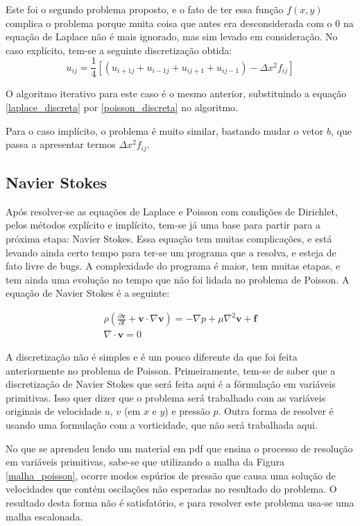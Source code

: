 \documentclass[journal]{IEEEtran}
\begin{document}
Este foi o segundo problema proposto, e o fato de ter essa função $f(x,y)$ complica o problema porque muita coisa que antes era desconsiderada com o $0$ na equação de Laplace não é mais ignorado, mas sim levado em consideração. No caso explícito, tem-se a seguinte discretização obtida:
\begin{equation}
u_{ij}=\frac{1}{4}[(u_{i+1j}+u_{i-1j}+u_{ij+1}+u_{ij-1})-\Delta x^2 f_{ij}] \label{poisson_discreta}
\end{equation}

O algoritmo iterativo para este caso é o mesmo anterior, substituindo a equação \ref{laplace_discreta} por \ref{poisson_discreta} no algoritmo.

Para o caso implícito, o problema é muito similar, bastando mudar o vetor $b$, que passa a apresentar termos $\Delta x^2 f_{ij}$.
\subsection{Navier Stokes}

Após resolver-se as equações de Laplace e Poisson com condições de Dirichlet, pelos métodos explícito e implícito, tem-se já uma base para partir para a próxima etapa: Navier Stokes. Essa equação tem muitas complicações, e está levando ainda certo tempo para ter-se um programa que a resolva, e esteja de fato livre de bugs. A complexidade do programa é maior, tem muitas etapas, e tem ainda uma evolução no tempo que não foi lidada no problema de Poisson. A equação de Navier Stokes é a seguinte:

\begin{eqnarray}
\rho\left( \frac{\partial \textbf{v}}{\partial
t}+\textbf{v}\cdot\nabla\textbf{v}\right)=-\nabla
p+\mu\nabla^2\textbf{v}+\textbf{f} \label{ns}\\
 \nabla\cdot \textbf{v}=0 \nonumber
\end{eqnarray}

A discretização não é simples e é um pouco diferente da que foi feita anteriormente no problema de Poisson. Primeiramente, tem-se de saber que a discretização de Navier Stokes que será feita aqui é a fórmulação em variáveis primitivas. Isso quer dizer que o problema será trabalhado com as variáveis originais de velocidade $u$, $v$ (em $x$ e $y$) e pressão $p$. Outra forma de resolver é usando uma formulação com a vorticidade, que não será trabalhada aqui.

No que se aprendeu lendo um material em pdf que ensina o processo de resolução em variáveis primitivas, sabe-se que utilizando a malha da Figura \ref{malha_poisson}, ocorre modos espúrios de pressão que causa uma solução de velocidades que contém oscilações não esperadas no resultado do problema. O resultado desta forma não é satisfatório, e para resolver este problema usa-se uma malha escalonada.
\end{document}
